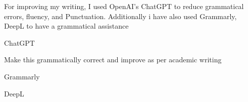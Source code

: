 \documentclass[../report.tex]{subfiles}
\begin{document}


    
    For improving my writing, I used OpenAI's ChatGPT to reduce grammatical errors, fluency, and Punctuation.
    Additionally i have also used Grammarly, DeepL to have a grammatical assistance
    \item ChatGPT
        \item Make this grammatically correct and improve as per academic writing
    \item Grammarly
    \item DeepL
\end{document}
